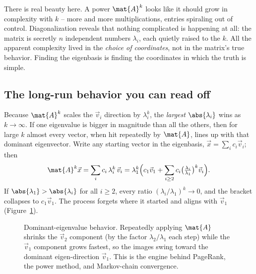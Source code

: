 \begin{aestheticbox}
There is real beauty here. A power $\mat{A}^k$ looks like it should grow in
complexity with $k$ -- more and more multiplications, entries spiraling out of
control. Diagonalization reveals that nothing complicated is happening at all:
the matrix is secretly $n$ independent numbers $\lambda_i$, each quietly raised to
the $k$. All the apparent complexity lived in the \emph{choice of coordinates},
not in the matrix's true behavior. Finding the eigenbasis is finding the
coordinates in which the truth is simple.
\end{aestheticbox}

\subsection{The long-run behavior you can read off}
\label{ch24:longrun}

Because $\mat{A}^k$ scales the $\vec{v}_i$ direction by $\lambda_i^k$, the
\emph{largest} $\abs{\lambda_i}$ wins as $k\to\infty$. If one eigenvalue is
bigger in magnitude than all the others, then for large $k$ almost every vector,
when hit repeatedly by $\mat{A}$, lines up with that dominant eigenvector. Write
any starting vector in the eigenbasis, $\vec{x} = \sum_i c_i\vec{v}_i$; then
\[
  \mat{A}^k\vec{x} = \sum_i c_i\,\lambda_i^k\,\vec{v}_i
  = \lambda_1^k\Big( c_1\vec{v}_1 + \sum_{i\ge 2} c_i\big(\tfrac{\lambda_i}{\lambda_1}\big)^k\vec{v}_i\Big).
\]
If $\abs{\lambda_1} > \abs{\lambda_i}$ for all $i\ge2$, every ratio
$(\lambda_i/\lambda_1)^k \to 0$, and the bracket collapses to $c_1\vec{v}_1$. The
process forgets where it started and aligns with $\vec{v}_1$
(Figure~\ref{ch24:fig-dominant}).

\begin{figure}[H]
\centering
{}
\caption{Dominant-eigenvalue behavior. Repeatedly applying $\mat{A}$ shrinks the
$\vec{v}_2$ component (by the factor $\lambda_2/\lambda_1$ each step) while the
$\vec{v}_1$ component grows fastest, so the images swing toward the dominant
eigen-direction $\vec{v}_1$. This is the engine behind PageRank, the power
method, and Markov-chain convergence.}
\label{ch24:fig-dominant}
\end{figure}


